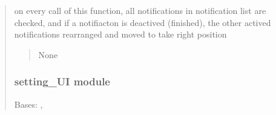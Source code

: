 \documentclass[letterpaper,10pt,english]{sphinxmanual}
\begin{document}
\begin{quote}
\begin{savenotes}
\begin{fulllineitems}
\begin{savenotes}
\begin{fulllineitems}
\begin{quote}
\begin{description}
\end{description}\end{quote}

\end{fulllineitems}\end{savenotes}


\end{fulllineitems}\end{savenotes}


\begin{savenotes}\begin{fulllineitems}
\label{\detokenize{setting/notif_UI:oxin.notif_UI.rearange_active_notifes}}
\pysigstartsignatures
{}
\pysigstopsignatures
\sphinxAtStartPar
on every call of this function, all notifications in notification list are checked, and if a notifiacton is deactived (finished),
the other actived notifications rearranged and moved to take right position
\begin{quote}\begin{description}
\sphinxAtStartPar
None

\end{description}\end{quote}

\end{fulllineitems}\end{savenotes}


\sphinxstepscope


\subsubsection{setting\_UI module}
\label{\detokenize{setting/setting_UI:module-oxin.setting_UI}}\label{\detokenize{setting/setting_UI:setting-ui-module}}\label{\detokenize{setting/setting_UI::doc}}

\begin{savenotes}\begin{fulllineitems}
\label{\detokenize{setting/setting_UI:oxin.setting_UI.UI_main_window}}
\pysigstartsignatures
{}
\pysigstopsignatures
\sphinxAtStartPar
Bases: , 


\end{fulllineitems}
\end{savenotes}
\end{quote}
\end{document}
